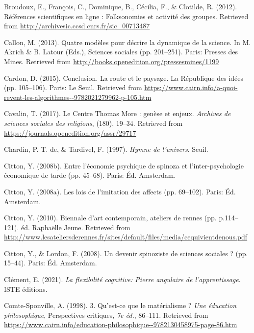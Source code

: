 \documentclass[
  a4paper,
  DIV=11,
  numbers=noendperiod]{scrreprt}
\newlength{\cslhangindent}
\newenvironment{CSLReferences}[2] %
 {\begin{list}{}{%
  \setlength{\itemindent}{0pt}
  \setlength{\leftmargin}{0pt}
  \setlength{\parsep}{0pt}
  \ifodd #1
   \setlength{\leftmargin}{\cslhangindent}
   \setlength{\itemindent}{-1\cslhangindent}
  \fi
  \setlength{\itemsep}{#2\baselineskip}}}
 {\end{list}}
\begin{document}
\begin{CSLReferences}{1}{0}
Broudoux, E., François, C., Dominique, B., Cécilia, F., \& Clotilde, R.
(2012). Références scientifiques en ligne : Folksonomies et activité des
groupes. Retrieved from
\url{http://archivesic.ccsd.cnrs.fr/sic_00713487}

Callon, M. (2013). Quatre modèles pour décrire la dynamique de la
science. In M. Akrich \& B. Latour (Eds.), Sciences sociales (pp.
201--251). Paris: Presses des Mines. Retrieved from
\url{http://books.openedition.org/pressesmines/1199}

Cardon, D. (2015). Conclusion. La route et le paysage. La République des
idées (pp. 105--106). Paris: Le Seuil. Retrieved from
\url{https://www.cairn.info/a-quoi-revent-les-algorithmes--9782021279962-p-105.htm}

Cavalin, T. (2017). Le Centre Thomas More : genèse et enjeux.
\emph{Archives de sciences sociales des religions}, (180), 19--34.
Retrieved from \url{https://journals.openedition.org/assr/29717}

Chardin, P. T. de, \& Tardivel, F. (1997). \emph{Hymne de l'univers}.
Seuil.

Citton, Y. (2008b). Entre l'économie psychique de spinoza et
l'inter-psychologie économique de tarde (pp. 45--68). Paris: Éd.
Amsterdam.

Citton, Y. (2008a). Les lois de l'imitation des affects (pp. 69--102).
Paris: Éd. Amsterdam.

Citton, Y. (2010). Biennale d{'}art contemporain, ateliers de rennes
(pp. p.114--121). éd. Raphaëlle Jeune. Retrieved from
\url{http://www.lesateliersderennes.fr/sites/default/files/media/cequivientdenous.pdf}

Citton, Y., \& Lordon, F. (2008). Un devenir spinoziste de sciences
sociales ? (pp. 15--44). Paris: Éd. Amsterdam.

Clément, E. (2021). \emph{La flexibilité cognitive: Pierre angulaire de
l'apprentissage}. ISTE éditions.

Comte-Sponville, A. (1998). 3. Qu'est-ce que le matérialisme ? \emph{Une
éducation philosophique}, Perspectives critiques, \emph{7e éd.},
86--111. Retrieved from
\url{https://www.cairn.info/education-philosophique--9782130458975-page-86.htm}


\end{CSLReferences}
\end{document}

